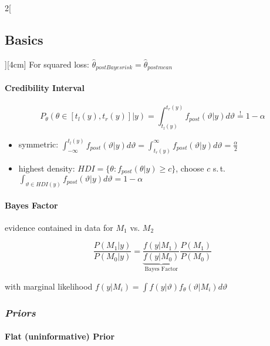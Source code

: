 \documentclass[8pt]{extarticle}
\begin{document}
\begin{multicols}{2}[\subsection{Basics}][4cm]
\noindent For squared loss: $\hat{\theta}_{postBayesrisk} = \hat{\theta}_{postmean}$


\paragraph{Credibility Interval}

$$P_\theta(\theta\in \left[t_l(y),t_r(y)\right]|y) = \int_{t_l(y)}^{t_r(y)} f_{post}(\vartheta|y)d\vartheta \overset{!}{=} 1- \alpha$$

\begin{itemize}
\item symmetric: $\int_{-\infty}^{t_l(y)} f_{post}(\vartheta|y)d\vartheta = \int_{t_r(y)}^{\infty} f_{post}(\vartheta|y)d\vartheta = \frac{\alpha}{2}$
\item highest density: $HDI = \{\theta : f_{post}(\theta|y)\geq c\}$, choose $c$ s.\,t.\  $\int_{\vartheta \in HDI(y)} f_{post}(\vartheta|y)d\vartheta = 1-\alpha$
\end{itemize}




\paragraph{Bayes Factor} evidence contained in data for $M_1$ vs. $M_2$

$$\frac{P(M_1|y)}{P(M_0|y)} =  \underbrace{\frac{f(y|M_1)}{f(y|M_0)}}_{\text{Bayes Factor}} \frac{P(M_1)}{P(M_0)}$$

with marginal likelihood $f(y|M_i) = \int f(y|\vartheta)f_\theta(\vartheta|M_i)d\vartheta$


\subsubsection*{\textit{Priors}}

\paragraph{Flat (uninformative) Prior} \ \\


\end{multicols}
\end{document}
